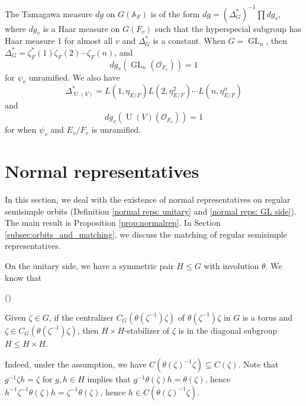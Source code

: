 \documentclass[11pt, reqno]{amsart}
\numberwithin{equation}{subsection}
\theoremstyle{plain}
\theoremstyle{definition}
\newcommand{\BA}{\mathbb A}
\renewcommand{\O}{\mathcal O}
\DeclareMathOperator{\GL}{GL}
\DeclareMathOperator{\U}{U}
\newcounter{keepeqno}
\newenvironment{num}
 {\setcounter{keepeqno}{\value{equation}}%
  \begin{list}{(\theequation)}{\usecounter{equation}}%
  \setcounter{equation}{\value{keepeqno}}}
 {\end{list}}
\begin{document}
The Tamagawa measure $dg$ on $G(\BA_F)$ is of the form $dg = (\Delta_G^*)^{-1} \prod dg_v$, where $dg_v$ is a Haar measure on $G(F_v)$ such that the hyperspecial subgroup has Haar measure 1 for almost all $v$ and $\Delta_G^*$ is a constant. When $G = \GL_n$, then $\Delta_G^* = \zeta_F^*(1) \zeta_F(2) \cdots \zeta_F(n)$, and
\[
    dg_v(\GL_n(\O_{F_v}))
    = 1
\]
for $\psi_v$ unramified.
We also have
\[
    \Delta_{\U(V)}^* = L(1,\eta_{E/F}) L(2,\eta_{E/F}^2) \cdots L(n,\eta^n_{E/F})
\]
and
\[
    dg_v(\U(V)(\O_{F_v}))
    = 1
\]
for when $\psi_v$ and $E_v/F_v$ is unramified.



















\section{Normal representatives}
\label{section: representatives}

In this section, we deal with the existence of normal representatives on regular semisimple orbits (Definition \ref{normal reps: unitary} and \ref{normal reps: GL side}). The main result is Proposition \ref{prop:normalrep}. In Section \ref{subsec:orbits_and_matching}, we discuss the matching of regular semisimple representatives.

On the unitary side, we have a symmetric pair $H \leq G$ with involution $\theta$. We know that
 
\begin{num} 
    \item \label{eq:centralizer_in_diagonal} Given $\zeta \in G$, if the centralizer $C_G(\theta(\zeta^{-1})\zeta)$ of $\theta(\zeta^{-1}) \zeta$ in $G$ is a torus and $\zeta \in C_G(\theta(\zeta^{-1})\zeta)$, then $H \times H$-stabilizer of $\zeta$ is in the diagonal subgroup $H \leq H \times H$.
\end{num}

Indeed, under the assumption, we have $C(\theta(\zeta)^{-1}\zeta) \subseteq C(\zeta)$. Note that $g^{-1}\zeta h =\zeta$ for $g, h \in H$ implies that $g^{-1}\theta(\zeta) h =\theta(\zeta)$, hence $h^{-1} \zeta^{-1} \theta(\zeta) h= \zeta^{-1} \theta(\zeta)$, hence $h \in C(\theta(\zeta)^{-1}\zeta)$.
\end{document}
